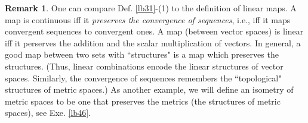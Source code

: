 \documentclass[12pt,b5paper,notitlepage]{article}
\theoremstyle{definition}
\newtheorem{rem}[df]{Remark}
\theoremstyle{plain}
\numberwithin{equation}{section}
\begin{document}
\begin{rem}
One can compare Def. \ref{lb31}-(1) to the definition of linear maps. A map is continuous iff it \textit{preserves the convergence of sequences}, i.e., iff it maps convergent sequences to convergent ones. A map (between vector spaces) is linear iff it perserves the addition and the scalar multiplication of vectors. In general, a good map between two sets with ``structures" is a map which preserves the structures. (Thus, linear combinations encode the linear structures of vector spaces. Similarly, the convergence of sequences remembers the ``topological" structures of metric spaces.) As another example, we will define an isometry of metric spaces to be one that preserves the metrics (the structures of metric spaces), see Exe. \ref{lb46}.
\end{rem}
\end{document}
